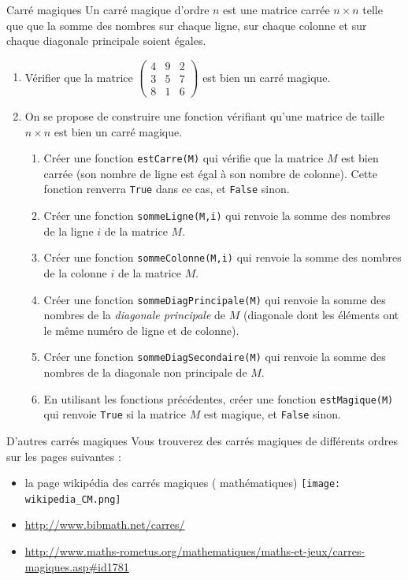 \documentclass[a4paper,11pt]{article}
\begin{document}
\begin{ExerciceNomme}{Carré magiques}
Un carré magique d'ordre $n$ est une matrice carrée $n\times n$ telle que que la somme des nombres sur chaque ligne, sur chaque colonne et sur chaque diagonale principale soient égales.
\begin{enumerate}
\item Vérifier que la matrice $\begin{pmatrix} 4&9&2\\3&5&7\\8&1&6\end{pmatrix}$ est bien un carré magique.
\item On se propose de construire une fonction vérifiant qu'une matrice de taille $n \times n$ est bien un carré magique.
\begin{enumerate}
\item Créer une fonction \texttt{estCarre(M)} qui vérifie que la matrice $M$ est bien carrée (son nombre de ligne est égal à son nombre de colonne). Cette fonction renverra \texttt{True} dans ce cas, et \texttt{False} sinon.
\item Créer une fonction \texttt{sommeLigne(M,i)} qui renvoie la somme des nombres de la ligne $i$ de la matrice $M$.
\item Créer une fonction \texttt{sommeColonne(M,i)} qui renvoie la somme des nombres de la colonne $i$ de la matrice $M$.
\item Créer une fonction \texttt{sommeDiagPrincipale(M)} qui renvoie la somme des nombres de la \textit{diagonale principale} de $M$ (diagonale dont les éléments ont le même numéro de ligne et de colonne).
\item Créer une fonction \texttt{sommeDiagSecondaire(M)} qui renvoie la somme des nombres de la diagonale non principale de $M$.
\item En utilisant les fonctions précédentes, créer une fonction \texttt{estMagique(M)} qui renvoie \texttt{True} si la matrice $M$ est magique, et \texttt{False} sinon.
\end{enumerate}
\end{enumerate}
\begin{info}{D'autres carrés magiques}
Vous trouverez des carrés magiques de différents ordres sur les pages suivantes :
\trianglenoir
\begin{itemize}
\item la page wikipédia des carrés magiques ( mathématiques) \texttt{[image: wikipedia\_CM.png]}
\item \url{http://www.bibmath.net/carres/}
\item \url{http://www.maths-rometus.org/mathematiques/maths-et-jeux/carres-magiques.asp#id1781}
\end{itemize}
\end{info}
\end{ExerciceNomme}
\end{document}
